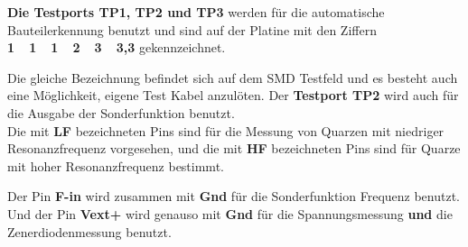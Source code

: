 \textbf {Die Testports TP1, TP2 und TP3} werden für die automatische Bauteilerkennung benutzt
und sind auf der Platine mit den Ziffern \textbf {1~~1~~1~~2~~3~~3,3} gekennzeichnet.

Die gleiche Bezeichnung befindet sich auf dem SMD Testfeld
und es besteht auch eine Möglichkeit, eigene Test Kabel anzulöten.
Der \textbf {Testport TP2} wird auch für die Ausgabe der Sonderfunktion  benutzt.\\
Die mit \textbf {LF} bezeichneten Pins sind für die Messung von Quarzen mit niedriger Resonanzfrequenz vorgesehen,
und die mit \textbf {HF} bezeichneten Pins sind für Quarze mit hoher Resonanzfrequenz bestimmt.

Der Pin \textbf {F-in} wird zusammen mit  \textbf {Gnd} für die Sonderfunktion Frequenz benutzt.
Und der Pin \textbf {Vext+} wird genauso mit \textbf {Gnd} für die Spannungsmessung
\textbf {und} die Zenerdiodenmessung benutzt.

